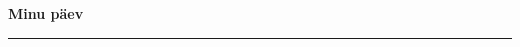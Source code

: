 \documentclass[10pt]{book}
\begin{document}
{
  \samepage
  \raggedbottom
  \raggedright
  \sloppy


  \vspace{0.2in}

  \noindent\begin{minipage}{.1\textwidth}
    \hfill\vspace{0.1in}
  \end{minipage}%
  \noindent\begin{minipage}{.8\textwidth}
    \centering
    \bfseries
    \large Minu p\"aev
  \end{minipage}%
  \noindent\begin{minipage}{.1\textwidth}
      \hfill\vspace{0.1in}
  \end{minipage}

  \nopagebreak[4]
  \vspace{0.1in}
  \nopagebreak[4]
  \hrule height 0.05ex
  \nopagebreak[4]
  \vspace{-0.05in}




}
\end{document}
